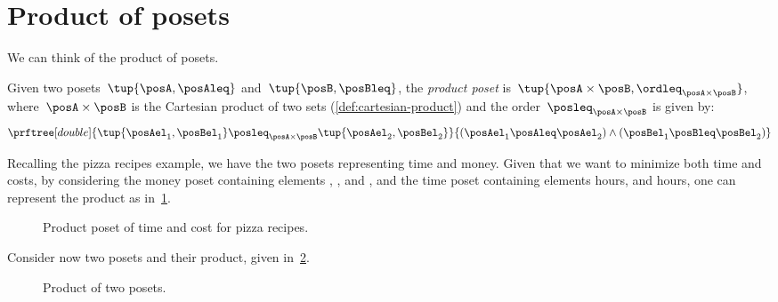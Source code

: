 
\section{Product of posets}
We can think of the product of posets.

\begin{definition}
  \label{def:productposet}
  Given two posets~$\tup{\posA, \posAleq}$
  and~$\tup{\posB, \posBleq}$, the \emph{product poset} is~$\tup{\posA \times \posB, \ordleq_{\posA\times \posB}}$, where~$\posA \times \posB$ is the Cartesian product of two sets (\cref{def:cartesian-product}) and the order~$\posleq_{\posA \times \posB}$ is given by:
  \begin{equation}
    \prftree[double]{\tup{\posAel_1, \posBel_1}
    \posleq_{\posA\times \posB}
    \tup{\posAel_2, \posBel_2}}{(\posAel_1 \posAleq \posAel_2) \wedge
    (\posBel_1 \posBleq \posBel_2)}
  \end{equation}
\end{definition}
Recalling the pizza recipes example, we have the two posets representing time and money.
Given that we want to minimize both time and costs, by considering the money poset containing elements \unit[1]{\stdcurr}, \unit[2]{\stdcurr}, and \unit[3]{\stdcurr}, and the time poset containing elements \unit[1]{hours}, and \unit[2]{hours}, one can represent the product as in~\cref{fig:productpizza}.

\begin{figure}[h!]
  \begin{center}
  \end{center}
  \caption{Product poset of time and cost for pizza recipes.}
  \label{fig:productpizza}
\end{figure}


\begin{example}
  Consider now two posets and their product, given in~\cref{fig:composing_posets_1}.
  \begin{figure}[h!]
    \begin{center}
    \end{center}
    \caption{Product of two posets.\label{fig:composing_posets_1}}
  \end{figure}
\end{example}